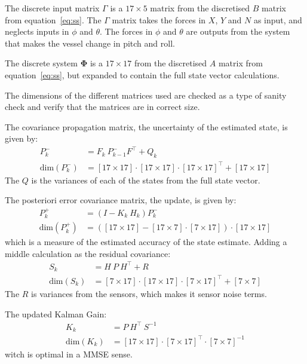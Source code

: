 The discrete input matrix $\Gamma$ is a $17 \times 5$ matrix from the discretised $B$ matrix from equation~\vref{eq:ss}. 
The $\Gamma$ matrix takes the forces in $X$, $Y$ and $N$ as input, and neglects inputs in $\phi$ and $\theta$. The forces in $\phi$ and $\theta$ are outputs from the system that makes the vessel change in pitch and roll.

The discrete system $\boldsymbol \Phi$ is a $17 \times 17$ from the discretised $A$ matrix from equation~\vref{eq:ss}, but expanded to contain the full state vector calculations.

The dimensions of the different matrices used are checked as a type of sanity check and verify that the matrices are in correct size.

The covariance propagation matrix, the uncertainty of the estimated state, is given by:
\begin{align}
P_k^- &= F_k\ P_{k-1}^-F^\top + Q_k\\
\text{dim}(P_k^-) &= [17 \times 17]\cdot [17 \times 17]\cdot [17 \times 17]^\top + [17 \times 17]
\end{align}
The $Q$ is the variances of each of the states from the full state vector.

The posteriori error covariance matrix, the update, is given by:
\begin{align}
P_k^+ &= (I - K_k\ H_k)P_k^-\\
\text{dim}(P_k^+) &= ([17 \times 17] - [17 \times 7]\cdot [7 \times 17])\cdot [17 \times 17]
\end{align}
which is a measure of the estimated accuracy of the state estimate. Adding a middle calculation as the residual covariance:
\begin{align}
S_k &= H\ P\ H^\top + R\\
\text{dim}(S_k) &= [7 \times 17]\cdot [17 \times 17]\cdot [7 \times 17]^\top + [7 \times 7]
\end{align}
The $R$ is variances from the sensors, which makes it sensor noise terms.

The updated Kalman Gain:
\begin{align}
K_k &= P\ H^\top\ S^{-1}\\
\text{dim}(K_k) &= [17 \times 17]\cdot [7 \times 17]^\top\cdot [7 \times 7]^{-1}
\end{align}
witch is optimal in a \ac{MMSE} sense. %

